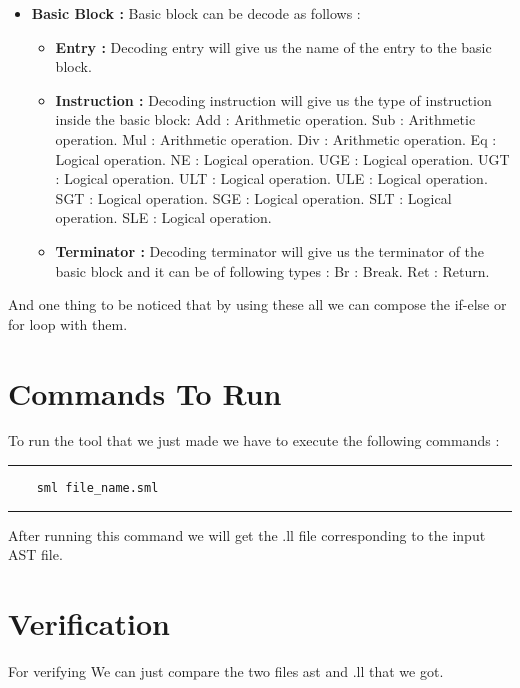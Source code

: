 \documentclass[openany]{book}
\begin{document}
\begin{itemize}
\begin{itemize}
	\end{itemize}
	\item \textbf{Basic Block : } Basic block can be decode as follows :
	\begin{itemize}
		\item \textbf{Entry : } Decoding entry will give us the name of the entry to the basic block.
		\item \textbf{Instruction : } Decoding instruction will give us the type of instruction inside the basic block:
			\subitem Add : Arithmetic operation. 
			\subitem Sub : Arithmetic operation.
			\subitem Mul : Arithmetic operation. 
			\subitem Div : Arithmetic operation.
			\subitem Eq : Logical operation.
			\subitem NE : Logical operation.   
			\subitem UGE : Logical operation.
			\subitem UGT : Logical operation.
			\subitem ULT : Logical operation. 
			\subitem ULE : Logical operation.
			\subitem SGT : Logical operation.
			\subitem SGE : Logical operation.
			\subitem SLT : Logical operation.
			\subitem SLE : Logical operation.
		\item \textbf{Terminator : } Decoding terminator will give us the terminator of the basic block and it can be of following types : 
			\subitem Br : Break.
			\subitem Ret : Return.
	\end{itemize}
\end{itemize}
 
And one thing to be noticed that by using these all we can compose the if-else or for loop with them.\newpage

\section{Commands To Run}
To run the tool that we just made we have to execute the following commands :\newline

\noindent\rule{12cm}{0.4pt}

\begin{verbatim}
	sml file_name.sml
\end{verbatim}

\noindent\rule{12cm}{0.4pt} \newline

After running this command we will get the .ll file corresponding to the input AST file.

\section{Verification}
For verifying We can just compare the two files ast and .ll that we got.
\end{document}
